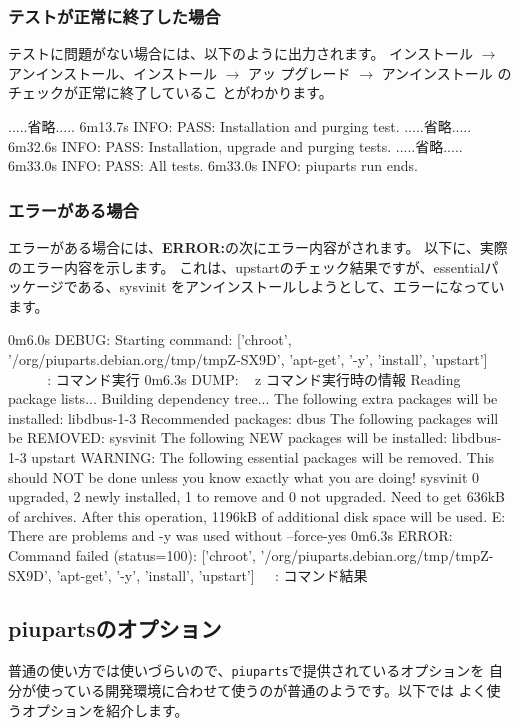 \documentclass[mingoth,a4paper]{jsarticle}
\begin{document}
\subsubsection{テストが正常に終了した場合}

テストに問題がない場合には、以下のように出力されます。
インストール $\rightarrow$ アンインストール、インストール $\rightarrow$ アッ
プグレード $\rightarrow$ アンインストール のチェックが正常に終了しているこ
とがわかります。
\begin{commandline}
.....省略.....
6m13.7s INFO: PASS: Installation and purging test.
.....省略.....
6m32.6s INFO: PASS: Installation, upgrade and purging tests.
.....省略.....
6m33.0s INFO: PASS: All tests.
6m33.0s INFO: piuparts run ends.
\end{commandline}

\subsubsection{エラーがある場合}

エラーがある場合には、{\bf ERROR:}の次にエラー内容がされます。
以下に、実際のエラー内容を示します。
これは、upstartのチェック結果ですが、essentialパッケージである、sysvinit
をアンインストールしようとして、エラーになっています。

\begin{commandline}
0m6.0s DEBUG: Starting command: ['chroot', '/org/piuparts.debian.org/tmp/tmpZ-SX9D', 'apt-get', '-y', 'install', 'upstart']
^^^^^^^^^^^^^^^^^^^^^^^^^^^^^^: コマンド実行
0m6.3s DUMP:
^^^^^^^^^^^: コマンド実行時の情報
  Reading package lists...
  Building dependency tree...
  The following extra packages will be installed:
    libdbus-1-3
  Recommended packages:
    dbus
  The following packages will be REMOVED:
    sysvinit
  The following NEW packages will be installed:
    libdbus-1-3 upstart
  WARNING: The following essential packages will be removed.
  This should NOT be done unless you know exactly what you are doing!
    sysvinit
  0 upgraded, 2 newly installed, 1 to remove and 0 not upgraded.
  Need to get 636kB of archives.
  After this operation, 1196kB of additional disk space will be used.
  E: There are problems and -y was used without --force-yes
0m6.3s ERROR: Command failed (status=100): ['chroot', '/org/piuparts.debian.org/tmp/tmpZ-SX9D', 'apt-get', '-y', 'install', 'upstart']
^^^^^^^^^^^^: コマンド結果
\end{commandline}

\subsection{piupartsのオプション}
普通の使い方では使いづらいので、\texttt{piuparts}で提供されているオプションを
自分が使っている開発環境に合わせて使うのが普通のようです。以下では
よく使うオプションを紹介します。
\end{document}
